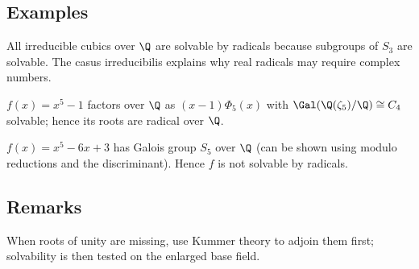 \subsection{Examples}

\begin{example}[Cubic]
All irreducible cubics over $\Q$ are solvable by radicals because subgroups of $S_3$ are solvable. The casus irreducibilis explains why real radicals may require complex numbers.
\end{example}

\begin{example}
$f(x)=x^5-1$ factors over $\Q$ as $(x-1)\Phi_5(x)$ with $\Gal(\Q(\zeta_5)/\Q)\cong C_4$ solvable; hence its roots are radical over $\Q$.
\end{example}

\begin{example}
$f(x)=x^5-6x+3$ has Galois group $S_5$ over $\Q$ (can be shown using modulo reductions and the discriminant). Hence $f$ is not solvable by radicals.
\end{example}

\subsection{Remarks}
\begin{remark}
When roots of unity are missing, use Kummer theory to adjoin them first; solvability is then tested on the enlarged base field.
\end{remark}
